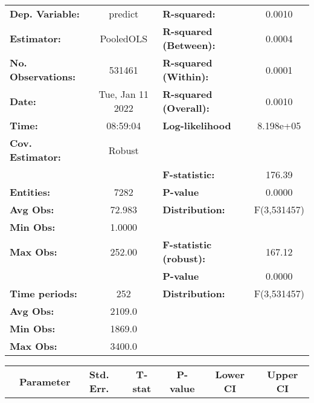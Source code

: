 \begin{center}
\begin{tabular}{lclc}
\toprule
\textbf{Dep. Variable:}    &      predict       & \textbf{  R-squared:         }   &      0.0010      \\
\textbf{Estimator:}        &     PooledOLS      & \textbf{  R-squared (Between):}  &      0.0004      \\
\textbf{No. Observations:} &       531461       & \textbf{  R-squared (Within):}   &      0.0001      \\
\textbf{Date:}             &  Tue, Jan 11 2022  & \textbf{  R-squared (Overall):}  &      0.0010      \\
\textbf{Time:}             &      08:59:04      & \textbf{  Log-likelihood     }   &    8.198e+05     \\
\textbf{Cov. Estimator:}   &       Robust       & \textbf{                     }   &                  \\
\textbf{}                  &                    & \textbf{  F-statistic:       }   &      176.39      \\
\textbf{Entities:}         &        7282        & \textbf{  P-value            }   &      0.0000      \\
\textbf{Avg Obs:}          &       72.983       & \textbf{  Distribution:      }   &   F(3,531457)    \\
\textbf{Min Obs:}          &       1.0000       & \textbf{                     }   &                  \\
\textbf{Max Obs:}          &       252.00       & \textbf{  F-statistic (robust):} &      167.12      \\
\textbf{}                  &                    & \textbf{  P-value            }   &      0.0000      \\
\textbf{Time periods:}     &        252         & \textbf{  Distribution:      }   &   F(3,531457)    \\
\textbf{Avg Obs:}          &       2109.0       & \textbf{                     }   &                  \\
\textbf{Min Obs:}          &       1869.0       & \textbf{                     }   &                  \\
\textbf{Max Obs:}          &       3400.0       & \textbf{                     }   &                  \\
\bottomrule
\end{tabular}
\begin{tabular}{lcccccc}
                & \textbf{Parameter} & \textbf{Std. Err.} & \textbf{T-stat} & \textbf{P-value} & \textbf{Lower CI} & \textbf{Upper CI}  \\

\end{tabular}
\end{center}
